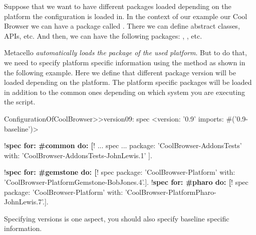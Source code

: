 \documentclass[a4paper,10pt,twoside]{book}
\begin{document}
Suppose that we want to have different packages loaded depending on the platform the configuration is loaded in. In the context of our example our Cool Browser we can have a package called . There we can define abstract classes, APIs, etc. And then, we can have the following packages: , , etc.

Metacello \emph{automatically loads the package of the used platform}. But to do that, we need to specify platform specific information using the method  as shown in the following example. Here we define that different package version will be loaded depending on the platform. The platform specific packages will be loaded in addition to the common ones depending on which system you are executing the script. 

\begin{code}{} 
ConfigurationOfCoolBrowser>>version09: spec 
       <version: '0.9' imports: #('0.9-baseline')>
       
       !\textbf{spec for: \#common do: [}!
              ...
              spec 
                 ...
                     package: 'CoolBrowser-AddonsTests' with: 'CoolBrowser-AddonsTests-JohnLewis.1' ].
       
       !\textbf{spec for: \#gemstone do: [}!
              spec package: 'CoolBrowser-Platform' with: 'CoolBrowser-PlatformGemstone-BobJones.4'.].
       !\textbf{spec for: \#pharo do: [}!
              spec package: 'CoolBrowser-Platform' with: 'CoolBrowser-PlatformPharo-JohnLewis.7'.].
\end{code}

Specifying versions is one aspect, you should also specify baseline specific information. 
\end{document}
